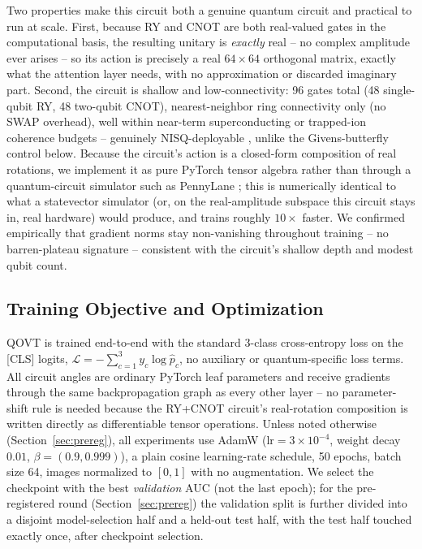 \documentclass[10pt,letterpaper]{article}
\theoremstyle{plain}
\theoremstyle{definition}
\begin{document}
Two properties make this circuit both a genuine quantum circuit and
practical to run at scale. First, because RY and CNOT are both real-valued
gates in the computational basis, the resulting unitary is \emph{exactly}
real -- no complex amplitude ever arises -- so its action is precisely a
real $64{\times}64$ orthogonal matrix, exactly what the attention layer
needs, with no approximation or discarded imaginary part. Second, the
circuit is shallow and low-connectivity: 96 gates total (48 single-qubit
RY, 48 two-qubit CNOT), nearest-neighbor ring connectivity only (no SWAP
overhead), well
within near-term superconducting or trapped-ion coherence budgets --
genuinely NISQ-deployable \citep{preskill2018quantum,bharti2022nisq}, unlike
the Givens-butterfly control below. Because the circuit's action is a
closed-form composition of real rotations, we implement it as pure PyTorch
tensor algebra rather than through a quantum-circuit simulator such as
PennyLane \citep{pennylane}; this is numerically identical to what a
statevector simulator (or, on the real-amplitude subspace this circuit
stays in, real hardware) would produce, and trains roughly $10\times$
faster. We confirmed empirically that gradient norms stay non-vanishing
throughout training -- no barren-plateau signature -- consistent with the
circuit's shallow depth and modest qubit count.

\subsection{Training Objective and Optimization}
\label{sec:training}

QOVT is trained end-to-end with the standard 3-class cross-entropy loss on
the [CLS] logits, $\mathcal{L} = -\sum_{c=1}^{3} y_c \log \hat p_c$, no
auxiliary or quantum-specific loss terms. All circuit angles are ordinary
PyTorch leaf parameters and receive gradients through the same
backpropagation graph as every other layer -- no parameter-shift rule is
needed because the RY+CNOT circuit's real-rotation composition is written
directly as differentiable tensor operations. Unless noted otherwise
(Section~\ref{sec:prereg}), all experiments use AdamW ($\mathrm{lr}{=}3\times
10^{-4}$, weight decay $0.01$, $\beta{=}(0.9,0.999)$), a plain cosine
learning-rate schedule, 50 epochs, batch size 64, images normalized to
$[0,1]$ with no augmentation. We select the checkpoint with the best
\emph{validation} AUC (not the last epoch); for the pre-registered round
(Section~\ref{sec:prereg}) the validation split is further divided into a
disjoint model-selection half and a held-out test half, with the test half
touched exactly once, after checkpoint selection.
\end{document}
